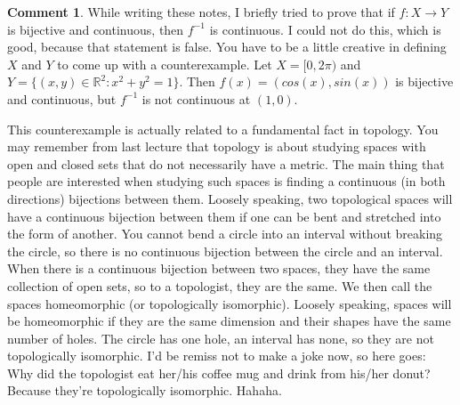 \documentclass[12pt,reqno]{amsart}
\theoremstyle{definition}
\newtheorem{remark}{Comment}[section]
\def\R{\mathbb{R}}
\renewcommand{\to}{{\rightarrow}}
\begin{document}
\begin{remark}
  While writing these notes, I briefly tried to prove that if $f:X \to
  Y$ is bijective and continuous, then $f^{-1}$ is continuous. I could
  not do this, which is good, because that statement is false. You have
  to be a little creative in defining $X$ and $Y$ to come up with a
  counterexample. Let $X = [0,2\pi)$ and $Y = \{(x,y) \in \R^2: x^2 +
  y^2 = 1 \}$. Then $f(x) = (cos(x), sin(x))$ is bijective and
  continuous, but $f^{-1}$ is not continuous at $(1,0)$. 
  
  This counterexample is actually related to a fundamental fact in
  topology. You may remember from last lecture that topology is about
  studying spaces with open and closed sets that do not necessarily
  have a metric. The main thing that people are interested when
  studying such spaces is finding a continuous (in both directions)
  bijections between them. Loosely speaking, two topological spaces
  will have a continuous bijection between them if one can be bent and
  stretched into the form of another. You cannot bend a circle into an
  interval without breaking the circle, so there is no continuous
  bijection between the circle and an interval. When there is a
  continuous bijection between two spaces, they have the same
  collection of open sets, so to a topologist, they are the same. We
  then call the spaces homeomorphic (or topologically
  isomorphic). Loosely speaking, spaces will be homeomorphic if they
  are the same dimension and their shapes have the same number of
  holes.  The circle has one hole, an interval has none, so they are
  not topologically isomorphic. I'd be remiss not to make a joke now,
  so here goes: Why did the topologist eat her/his coffee mug and
  drink from his/her donut?  Because they're topologically
  isomorphic. Hahaha.
\end{remark}
\end{document}
